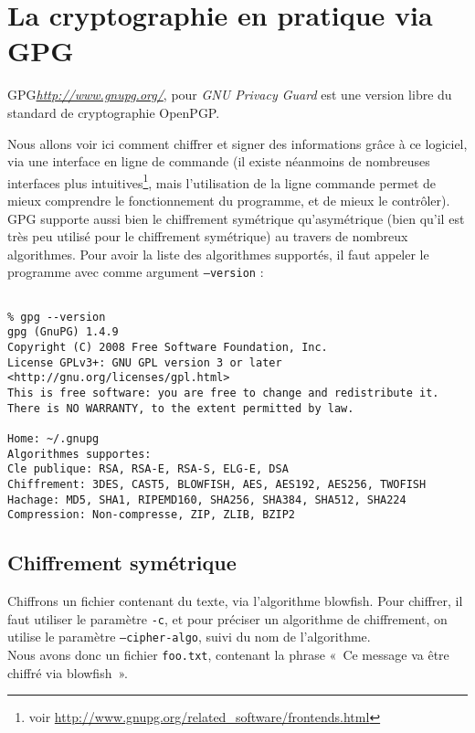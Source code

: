 \chapter{La cryptographie en pratique via GPG}
GPG\emph{\url{http://www.gnupg.org/}}, pour 
\emph{GNU Privacy Guard} est une version libre du
standard de cryptographie OpenPGP.


Nous allons voir ici comment chiffrer et signer des informations 
grâce à ce
logiciel, via une interface en ligne de commande (il existe
néanmoins de nombreuses interfaces plus intuitives\footnote{voir
\url{http://www.gnupg.org/related_software/frontends.html}}, mais
l'utilisation de la ligne commande permet de mieux comprendre le
fonctionnement du programme, et de mieux le contrôler).
\\

GPG supporte aussi bien le chiffrement symétrique qu'asymétrique
(bien qu'il est très peu utilisé pour le chiffrement symétrique)
au travers de nombreux algorithmes. Pour avoir la liste des
algorithmes supportés, il faut appeler le programme avec comme
argument \texttt{--version} : 

\lstset{language=bash}
\begin{lstlisting}

% gpg --version 
gpg (GnuPG) 1.4.9
Copyright (C) 2008 Free Software Foundation, Inc.
License GPLv3+: GNU GPL version 3 or later
<http://gnu.org/licenses/gpl.html>
This is free software: you are free to change and redistribute it.
There is NO WARRANTY, to the extent permitted by law.

Home: ~/.gnupg
Algorithmes supportes:
Cle publique: RSA, RSA-E, RSA-S, ELG-E, DSA
Chiffrement: 3DES, CAST5, BLOWFISH, AES, AES192, AES256, TWOFISH
Hachage: MD5, SHA1, RIPEMD160, SHA256, SHA384, SHA512, SHA224
Compression: Non-compresse, ZIP, ZLIB, BZIP2

\end{lstlisting}

\section{Chiffrement symétrique}
Chiffrons un fichier contenant du texte, via l'algorithme
blowfish. Pour chiffrer, il faut utiliser le paramètre
\texttt{-c}, et pour préciser un algorithme de chiffrement, on
utilise le paramètre \texttt{--cipher-algo}, suivi du nom de
l'algorithme.\\
Nous avons donc un fichier \texttt{foo.txt}, contenant la phrase
«~Ce message va être chiffré via blowfish~».

